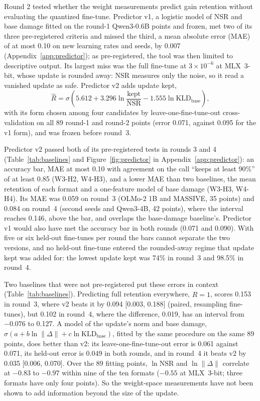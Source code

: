 \documentclass[10pt]{article}
\begin{document}
Round 2 tested whether the weight measurements predict gain retention without evaluating the quantized fine-tune. Predictor v1, a logistic model of NSR and base damage fitted on the round-1 Qwen3-0.6B points and frozen, met two of its three pre-registered criteria and missed the third, a mean absolute error (MAE) of at most 0.10 on new learning rates and seeds, by 0.007 (Appendix~\ref{app:predictor}); as pre-registered, the tool was then limited to descriptive output. Its largest miss was the full fine-tune at $3\times10^{-6}$ at MLX~3-bit, whose update is rounded away: NSR measures only the noise, so it read a vanished update as safe. Predictor v2 adds update kept,
\begin{equation}
\hat R = \sigma\left(5.612 + 3.296 \ln \frac{\mathrm{kept}}{\mathrm{NSR}} - 1.555 \ln \mathrm{KLD}_{\mathrm{base}}\right),
\end{equation}
with its form chosen among four candidates by leave-one-fine-tune-out cross-validation on all 89 round-1 and round-2 points (error 0.071, against 0.095 for the v1 form), and was frozen before round~3.

Predictor v2 passed both of its pre-registered tests in rounds 3 and 4 (Table~\ref{tab:baselines} and Figure~\ref{fig:predictor} in Appendix~\ref{app:predictor}): an accuracy bar, MAE at most 0.10 with agreement on the call ``keeps at least 90\%'' of at least 0.85 (W3-H2, W4-H3), and a lower MAE than two baselines, the mean retention of each format and a one-feature model of base damage (W3-H3, W4-H4). Its MAE was 0.059 on round~3 (OLMo-2 1B and MASSIVE, 35 points) and 0.084 on round~4 (second seeds and Qwen3-4B, 42 points), where the interval reaches 0.146, above the bar, and overlaps the base-damage baseline's. Predictor v1 would also have met the accuracy bar in both rounds (0.071 and 0.090). With five or six held-out fine-tunes per round the bars cannot separate the two versions, and no held-out fine-tune entered the rounded-away regime that update kept was added for: the lowest update kept was 74\% in round~3 and 98.5\% in round~4.

Two baselines that were not pre-registered put these errors in context (Table~\ref{tab:baselines}). Predicting full retention everywhere, $\hat R = 1$, scores 0.153 in round~3, where v2 beats it by 0.094 [0.003, 0.188] (paired, resampling fine-tunes), but 0.102 in round~4, where the difference, 0.019, has an interval from $-0.076$ to 0.127. A model of the update's norm and base damage, $\sigma(a + b \ln \lVert\Delta\rVert + c \ln \mathrm{KLD}_{\mathrm{base}})$, fitted by the same procedure on the same 89 points, does better than v2: its leave-one-fine-tune-out error is 0.061 against 0.071, its held-out error is 0.049 in both rounds, and in round~4 it beats v2 by 0.035 [0.006, 0.070]. Over the 89 fitting points, $\ln \mathrm{NSR}$ and $\ln \lVert\Delta\rVert$ correlate at $-0.83$ to $-0.97$ within nine of the ten formats ($-0.55$ at MLX~3-bit; three formats have only four points). So the weight-space measurements have not been shown to add information beyond the size of the update.
\end{document}
